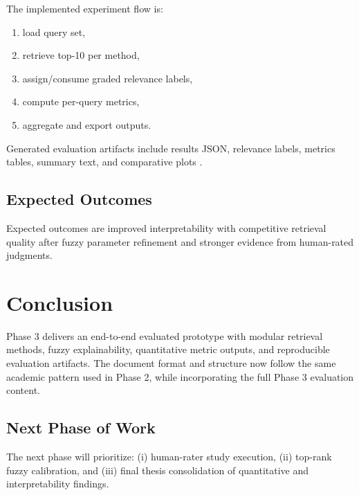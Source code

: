 \documentclass[11pt,a4paper]{article}
\begin{document}
The implemented experiment flow is:
\begin{enumerate}
  \item load query set,
  \item retrieve top-10 per method,
  \item assign/consume graded relevance labels,
  \item compute per-query metrics,
  \item aggregate and export outputs.
\end{enumerate}

Generated evaluation artifacts include results JSON, relevance labels, metrics tables, summary text, and comparative plots \citep{experimentResults2026,groundTruthAuto2026,experimentRunnerCode2026}.

\subsection{Expected Outcomes}

Expected outcomes are improved interpretability with competitive retrieval quality after fuzzy parameter refinement and stronger evidence from human-rated judgments.

\section{Conclusion}

Phase 3 delivers an end-to-end evaluated prototype with modular retrieval methods, fuzzy explainability, quantitative metric outputs, and reproducible evaluation artifacts. The document format and structure now follow the same academic pattern used in Phase 2, while incorporating the full Phase 3 evaluation content.

\subsection{Next Phase of Work}

The next phase will prioritize: (i) human-rater study execution, (ii) top-rank fuzzy calibration, and (iii) final thesis consolidation of quantitative and interpretability findings.

\printbibliography
\end{document}
